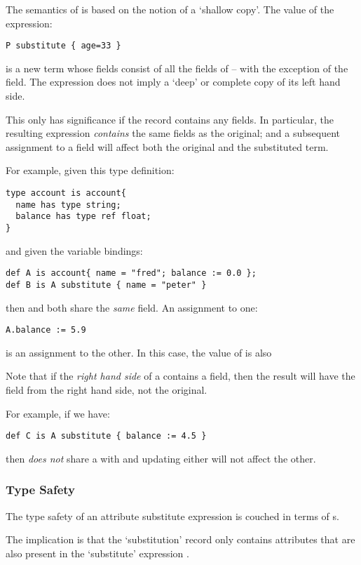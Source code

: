 \noindent
The semantics of  is based on the notion of a `shallow copy'. The value of the expression:
\begin{lstlisting}
P substitute { age=33 }
\end{lstlisting}
is a new term whose fields consist of all the fields of  -- with the exception of the  field. The  expression does not imply a `deep' or complete copy of its left hand side. 
\begin{aside}
This only has significance if the record contains any  fields. In particular, the resulting expression \emph{contains} the same  fields as the original; and a subsequent assignment to a  field will affect both the original and the substituted term.

For example, given this type definition:
\begin{lstlisting}
type account is account{
  name has type string;
  balance has type ref float;
}
\end{lstlisting}
and given the variable bindings:
\begin{lstlisting}
def A is account{ name = "fred"; balance := 0.0 };
def B is A substitute { name = "peter" }
\end{lstlisting}
then  and  both share the \emph{same}  field. An assignment to one:
\begin{lstlisting}
A.balance := 5.9
\end{lstlisting}
is an assignment to the other. In this case, the value of  is also 
\end{aside}
\begin{aside}
Note that if the \emph{right hand side} of a  contains a  field, then the result will have the  field from the right hand side, not the original.

For example, if we have:
\begin{lstlisting}
def C is A substitute { balance := 4.5 }
\end{lstlisting}
then  \emph{does not} share a  with  and updating either will not affect the other.
\end{aside}

\subsubsection{Type Safety}
The type safety of an attribute substitute expression is couched in terms of s.
\begin{prooftree}
\end{prooftree}
The implication is that the `substitution' record  only contains attributes that are also present in the `substitute' expression .

